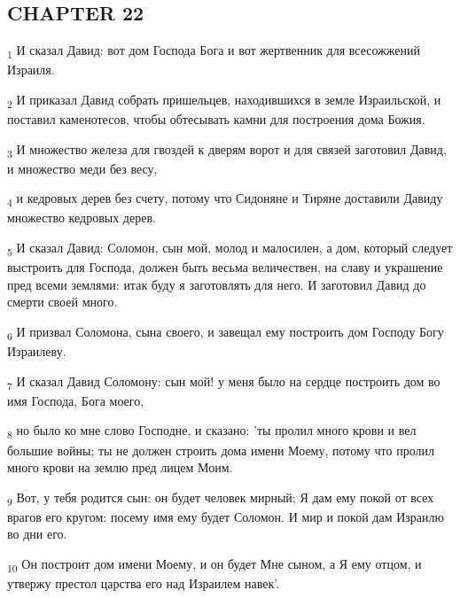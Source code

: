 \subsection{CHAPTER 22}
\begin{tcolorbox}
\textsubscript{1} И сказал Давид: вот дом Господа Бога и вот жертвенник для всесожжений Израиля.
\end{tcolorbox}
\begin{tcolorbox}
\textsubscript{2} И приказал Давид собрать пришельцев, находившихся в земле Израильской, и поставил каменотесов, чтобы обтесывать камни для построения дома Божия.
\end{tcolorbox}
\begin{tcolorbox}
\textsubscript{3} И множество железа для гвоздей к дверям ворот и для связей заготовил Давид, и множество меди без весу,
\end{tcolorbox}
\begin{tcolorbox}
\textsubscript{4} и кедровых дерев без счету, потому что Сидоняне и Тиряне доставили Давиду множество кедровых дерев.
\end{tcolorbox}
\begin{tcolorbox}
\textsubscript{5} И сказал Давид: Соломон, сын мой, молод и малосилен, а дом, который следует выстроить для Господа, должен быть весьма величествен, на славу и украшение пред всеми землями: итак буду я заготовлять для него. И заготовил Давид до смерти своей много.
\end{tcolorbox}
\begin{tcolorbox}
\textsubscript{6} И призвал Соломона, сына своего, и завещал ему построить дом Господу Богу Израилеву.
\end{tcolorbox}
\begin{tcolorbox}
\textsubscript{7} И сказал Давид Соломону: сын мой! у меня было на сердце построить дом во имя Господа, Бога моего,
\end{tcolorbox}
\begin{tcolorbox}
\textsubscript{8} но было ко мне слово Господне, и сказано: 'ты пролил много крови и вел большие войны; ты не должен строить дома имени Моему, потому что пролил много крови на землю пред лицем Моим.
\end{tcolorbox}
\begin{tcolorbox}
\textsubscript{9} Вот, у тебя родится сын: он будет человек мирный; Я дам ему покой от всех врагов его кругом: посему имя ему будет Соломон. И мир и покой дам Израилю во дни его.
\end{tcolorbox}
\begin{tcolorbox}
\textsubscript{10} Он построит дом имени Моему, и он будет Мне сыном, а Я ему отцом, и утвержу престол царства его над Израилем навек'.
\end{tcolorbox}
